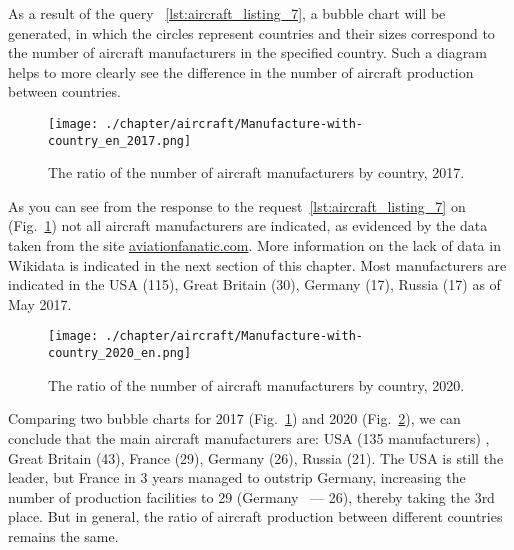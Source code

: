 As a result of the query ~\ref{lst:aircraft_listing_7}, a bubble chart will be generated, in which the circles represent countries and their 
sizes correspond to the number of aircraft manufacturers in the specified country. Such a diagram helps to more clearly see the difference 
in the number of aircraft production between countries.

\begin{figure}[h!]
\centering
	\texttt{[image: ./chapter/aircraft/Manufacture-with-country\_en\_2017.png]}
	\caption{The ratio of the number of aircraft manufacturers by country, 2017.}
	\label{fig:Manufacture-with-country_en_2017}
\end{figure}

As you can see from the response to the request~\ref{lst:aircraft_listing_7} on (Fig.~\ref{fig:Manufacture-with-country_en_2017}) not all 
aircraft manufacturers are indicated, as evidenced by the data taken from the site \href{https://www.aviationfanatic.com/}{aviationfanatic.com}. 
More information on the lack of data in Wikidata is indicated in the next section of this chapter. Most manufacturers are indicated in the 
USA (115), Great Britain (30), Germany (17), Russia (17) as of May 2017.

\label{question:aircraft_question_4}


\begin{figure}[h!]
\centering
	\texttt{[image: ./chapter/aircraft/Manufacture-with-country\_2020\_en.png]}
	\caption{The ratio of the number of aircraft manufacturers by country, 2020.}
	\label{fig:Manufacture-with-country_2020_en}
\end{figure}



Comparing two bubble charts for 2017 (Fig.~\ref{fig:Manufacture-with-country_en_2017}) and 2020 (Fig.~\ref{fig:Manufacture-with-country_2020_en}), 
we can conclude that the main aircraft manufacturers are: USA (135 manufacturers) , Great Britain (43), France (29), Germany (26), Russia (21). 
The USA is still the leader, but France in 3 years managed to outstrip Germany, increasing the number of production facilities to 29 
(Germany ~--- 26), thereby taking the 3rd place. But in general, the ratio of aircraft production between different countries remains the same.

